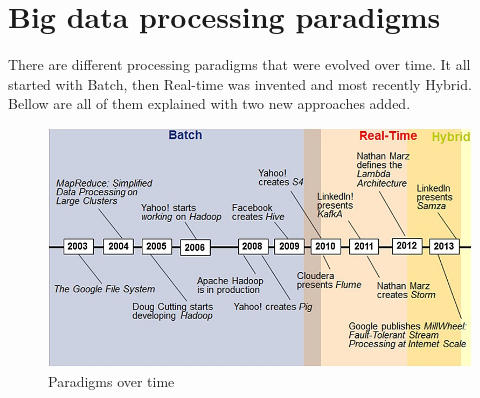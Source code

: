 \section{Big data processing paradigms}\label{Big data processing}

There are different processing paradigms that were evolved over time. It all started with Batch, then Real-time was invented and most recently Hybrid. Bellow are all of them explained with two new approaches added.


\begin{figure}[H]
\includegraphics[scale=0.70]{img/ProcessingParadigms/Process}
\centering
\caption{Paradigms over time \parencite{casado2015emerging}}
\label{fig:Process}
\end{figure}





